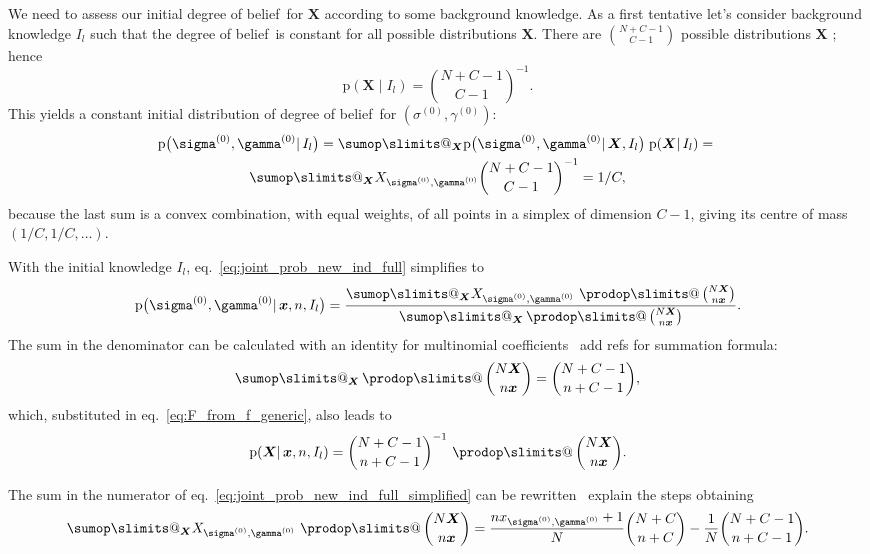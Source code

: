 \documentclass[\ifafour a4paper,12pt,\else a5paper,10pt,\fi%
onecolumn,oneside,article,%
british%
]{memoir}
\makeatletter
\theoremstyle{remark}
\theoremstyle{innote}
\def\sum{\DOTSI\sumop\slimits@}
\def\prod{\DOTSI\prodop\slimits@}
\newcommand*{\citep}{\parencites}
\newcommand*{\pf}{\mathrm{p}}%
\renewcommand*{\|}{\mathpunct{|}}
\newcommand*{\sect}{\S}%
\newcommand*{\eqn}{eq.}%
\newcommand*{\tprod}{\mathop{\textstyle\prod}\nolimits}
\newcommand*{\puzzle}{\maltese}
\newcommand{\mynote}[1]{ {\color{notecolour}\puzzle\ #1}}
\newcommand*{\dob}{degree of belief}
\newcommand*{\yprod}{\tprod}
\newcommand*{\ys}{\sigma}
\newcommand*{\yg}{\gamma}
\newcommand*{\gn}{l}
\newcommand*{\ysi}[1]{\ys^{(#1)}}
\newcommand*{\ygi}[1]{\yg^{(#1)}}
\newcommand*{\yso}{\ysi{0}}
\newcommand*{\ygo}{\ygi{0}}
\newcommand*{\yF}{\bm{X}}
\newcommand*{\yf}{\bm{x}}
\newcommand*{\yIc}{I_{\gn}}
\makeatother
\begin{document}
We need to assess our initial \dob\ for $\yF$ according to some
background knowledge. As a first tentative let's consider background
knowledge $\yIc$ such that the \dob\ is constant for all possible
distributions $\yF$. There are $\binom{N+C-1}{C-1}$ possible distributions
$\yF$ \citep[\sect~2.1]{csiszaretal2004b}; hence
\begin{equation}
  \label{eq:constant_prior}
  \pf(\yF \| \yIc) = \binom{N+C-1}{C-1}^{-1}.
\end{equation}
This yields a constant  initial  distribution of \dob\ for $(\yso,\ygo)$:
\begin{multline}
  \label{eq:joint_prob_initial_F_unknown}
  \pf\bigl(\yso, \ygo \| \yIc\bigr)  =
  \sum_{\yF}  \pf\bigl(\yso, \ygo \| \yF,\yIc\bigr) \;
  \pf( \yF \| \yIc) ={}\\
  \sum_{\yF}  X_{\yso, \ygo} \binom{N+C-1}{C-1}^{-1}
  = 1/C,
\end{multline}
because the last sum is a convex combination, with equal weights, of all
points in a simplex of dimension $C-1$, giving its centre of mass
$(1/C, 1/C, \dotso)$.

With the initial knowledge $\yIc$,
\eqn~\eqref{eq:joint_prob_new_ind_full} simplifies to
\begin{equation}
    \label{eq:joint_prob_new_ind_full_simplified}
  \pf\bigl(\yso, \ygo \| \yf, n,\yIc\bigr)  =
  \frac{
    \sum_{\yF} X_{\yso, \ygo}\,
    \yprod\binom{N\yF}{n\yf}}{
  \sum_{\yF} \yprod\binom{N\yF}{n\yf}}.
\end{equation}
The sum in the denominator can be calculated with an identity for
multinomial coefficients\mynote{add
  refs for summation formula}:
\begin{equation}
  \label{eq:multinomial_sum_identity}
  \sum_{\yF} \yprod\binom{N\yF}{n\yf} = \binom{N+C-1}{n+C-1},
\end{equation}
which, substituted in \eqn~\eqref{eq:F_from_f_generic}, also leads to
\begin{equation}
  \label{eq:F_from_f_specific}
  \pf(\yF \| \yf, n, \yIc) = \binom{N+C-1}{n+C-1}^{-1}\,\yprod\binom{N\yF}{n\yf}.
\end{equation}

The sum in the numerator of
\eqn~\eqref{eq:joint_prob_new_ind_full_simplified} can be
rewritten\mynote{explain the steps} obtaining
\begin{equation}
  \label{eq:numerator_constant_prior}
  \sum_{\yF} X_{\yso, \ygo}\, \yprod\binom{N\yF}{n\yf}
  =
  \frac{n x_{\yso, \ygo}+1}{N} \binom{N+C}{n+C}
  - \frac{1}{N}\binom{N+C-1}{n+C-1}.
\end{equation}
\end{document}
